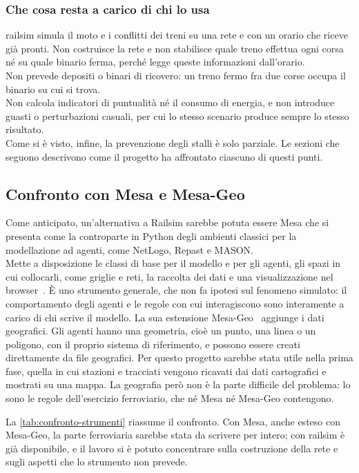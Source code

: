 \subsubsection{Che cosa resta a carico di chi lo usa}
railsim simula il moto e i conflitti dei treni su una rete e con un orario che riceve già pronti. Non costruisce la rete e non stabilisce quale treno effettua ogni corsa né su quale binario ferma, perché legge queste informazioni dall'orario. \\
Non prevede depositi o binari di ricovero: un treno fermo fra due corse occupa il binario su cui si trova. \\
Non calcola indicatori di puntualità né il consumo di energia, e non introduce guasti o perturbazioni casuali, per cui lo stesso scenario produce sempre lo stesso risultato. \\
Come si è visto, infine, la prevenzione degli stalli è solo parziale. Le sezioni che seguono descrivono come il progetto ha affrontato ciascuno di questi punti.

\subsection{Confronto con Mesa e Mesa-Geo}
Come anticipato, un'alternativa a Railsim sarebbe potuta essere Mesa che si presenta come la controparte in Python degli ambienti classici per la modellazione ad agenti, come NetLogo, Repast e MASON.\\
Mette a disposizione le classi di base per il modello e per gli agenti, gli spazi in cui collocarli, come griglie e reti, la raccolta dei dati e una visualizzazione nel browser~\cite{terhoeven2025mesa}.
È uno strumento generale, che non fa ipotesi sul fenomeno simulato: il comportamento degli agenti e le regole con cui interagiscono sono interamente a carico di chi scrive il modello.
La sua estensione Mesa-Geo~\cite{wang2022mesageo} aggiunge i dati geografici. Gli agenti hanno una geometria, cioè un punto, una linea o un poligono, con il proprio sistema di riferimento, e possono essere creati direttamente da file geografici. Per questo progetto sarebbe stata utile nella prima fase, quella in cui stazioni e tracciati vengono ricavati dai dati cartografici e mostrati su una mappa. 
La geografia però non è la parte difficile del problema: lo sono le regole dell'esercizio ferroviario, che né Mesa né Mesa-Geo contengono.

La \cref{tab:confronto-strumenti} riassume il confronto. Con Mesa, anche esteso con Mesa-Geo, la parte ferroviaria sarebbe stata da scrivere per intero; con railsim è già disponibile, e il lavoro si è potuto concentrare sulla costruzione della rete e sugli aspetti che lo strumento non prevede.

